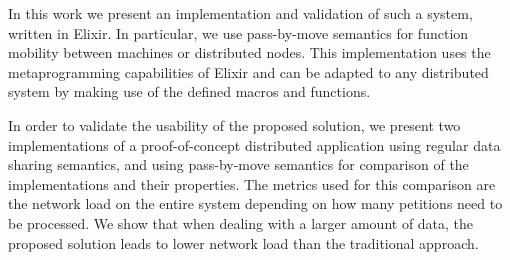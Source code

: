 In this work we present an implementation and validation of such a system, written in Elixir. In particular, we use pass-by-move semantics for function mobility between machines or distributed nodes. This implementation uses the metaprogramming capabilities of Elixir and can be adapted to any distributed system by making use of the defined macros and functions.

In order to validate the usability of the proposed solution, we present two implementations of a proof-of-concept distributed application using regular data sharing semantics, and using pass-by-move semantics for comparison of the implementations and their properties. The metrics used for this comparison are the network load on the entire system depending on how many petitions need to be processed. We show that when dealing with a larger amount of data, the proposed solution leads to lower network load than the traditional approach.


\endinput

